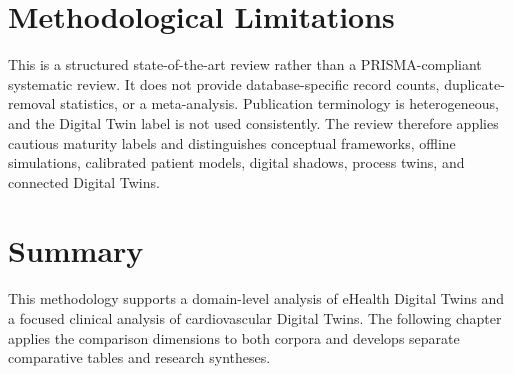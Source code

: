 \section{Methodological Limitations}
This is a structured state-of-the-art review rather than a PRISMA-compliant systematic review. It does not provide database-specific record counts, duplicate-removal statistics, or a meta-analysis. Publication terminology is heterogeneous, and the Digital Twin label is not used consistently. The review therefore applies cautious maturity labels and distinguishes conceptual frameworks, offline simulations, calibrated patient models, digital shadows, process twins, and connected Digital Twins.

\section{Summary}
This methodology supports a domain-level analysis of eHealth Digital Twins and a focused clinical analysis of cardiovascular Digital Twins. The following chapter applies the comparison dimensions to both corpora and develops separate comparative tables and research syntheses.

\clearpage
